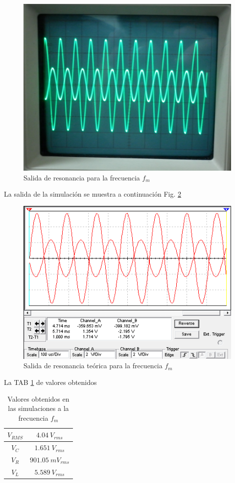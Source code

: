 \documentclass[twocolumn]{IEEEtran}
\begin{document}
\begin{figure}[H]
	\centering
		\includegraphics[scale=0.1]{366.png}
	\caption{Salida de resonancia para la frecuencia $f_m$}
	\label{fig2}
\end{figure}
\noindent
La salida de la simulación se muestra a continuación Fig. \ref{teo2}
\begin{figure}[H]
	\centering
		\includegraphics[scale=0.5]{sim1.png}
	\caption{Salida de resonancia teórica para la frecuencia $f_m$}
	\label{teo2}
\end{figure}
\noindent
La TAB \ref{tabteo2} de valores obtenidos 
\begin{table}[H]
	\centering
\begin{tabular}[c]{|c|c|} \hline
$V_{RMS}$ & $4.04 \ V_{rms}$ \\ \hline
$V_{C}$ & $1.651 \ V_{rms}$ \\ \hline
$V_{R}$ & $901.05 \ mV_{rms}$ \\ \hline
$V_{L}$ & $5.589 \ V_{rms}$ \\ \hline
\end{tabular}
	\caption{Valores obtenidos en las simulaciones a la frecuencia $f_m$}
	\label{tabteo2}
\end{table}
\end{document}

